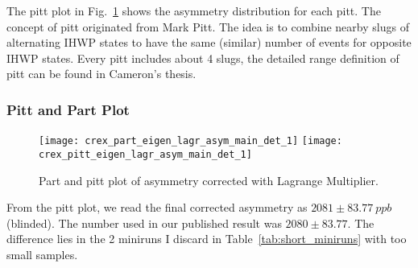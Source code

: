 The pitt plot in Fig.~\ref{fig:crex_part_pitt} shows the asymmetry distribution
for each pitt. The concept of pitt originated from Mark Pitt. The idea is to combine
nearby slugs of alternating IHWP states to have the same (similar) number of events for 
opposite IHWP states. Every pitt includes about 4 slugs, the detailed range definition
of pitt can be found in Cameron's thesis.

\subsubsection{Pitt and Part Plot}
\begin{figure}
    \centering
    \texttt{[image: crex\_part\_eigen\_lagr\_asym\_main\_det\_1]}
    \texttt{[image: crex\_pitt\_eigen\_lagr\_asym\_main\_det\_1]}
    \caption{Part and pitt plot of asymmetry corrected with Lagrange Multiplier.}
    \label{fig:crex_part_pitt}
\end{figure}

From the pitt plot, we read the final corrected asymmetry as $2081 \pm 83.77\ ppb$ (blinded).
The number used in our published result was $2080 \pm 83.77$. The difference 
lies in the 2 miniruns I discard in Table~\ref{tab:short_miniruns} with too small
samples.

